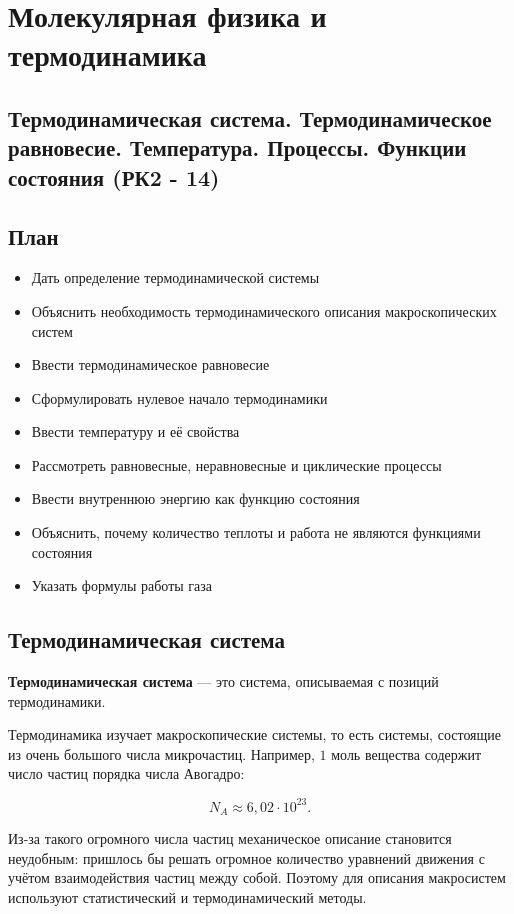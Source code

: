 \documentclass[a4paper,12pt]{article}
\begin{document}
\section{Молекулярная физика и термодинамика}

\subsection{Термодинамическая система. Термодинамическое равновесие. Температура. Процессы. Функции состояния (РК2 - 14)}

\subsection*{План}
\begin{itemize}
\item Дать определение термодинамической системы
\item Объяснить необходимость термодинамического описания макроскопических систем
\item Ввести термодинамическое равновесие
\item Сформулировать нулевое начало термодинамики
\item Ввести температуру и её свойства
\item Рассмотреть равновесные, неравновесные и циклические процессы
\item Ввести внутреннюю энергию как функцию состояния
\item Объяснить, почему количество теплоты и работа не являются функциями состояния
\item Указать формулы работы газа
\end{itemize}

\subsection*{Термодинамическая система}

\begin{definitionbox}
\textbf{Термодинамическая система} — это система, описываемая с позиций термодинамики.
\end{definitionbox}

Термодинамика изучает макроскопические системы, то есть системы, состоящие из очень большого числа микрочастиц. Например, $1$ моль вещества содержит число частиц порядка числа Авогадро:

\[
N_A \approx 6{,}02 \cdot 10^{23}.
\]

Из-за такого огромного числа частиц механическое описание становится неудобным: пришлось бы решать огромное количество уравнений движения с учётом взаимодействия частиц между собой. Поэтому для описания макросистем используют статистический и термодинамический методы.
\end{document}
